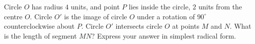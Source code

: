 Circle $O$ has radius $4$ units, and point $P$ lies inside the circle, $2$ units from the centre $O$. Circle $O'$ is the image of circle $O$ under a rotation of $90^\circ$ counterclockwise about $P$. Circle $O'$ intersects circle $O$ at points $M$ and $N$. What is the length of segment $MN$? Express your answer in simplest radical form.
